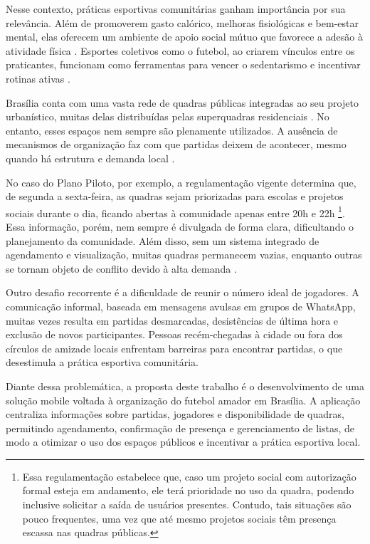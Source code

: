 Nesse contexto, práticas esportivas comunitárias ganham importância por sua relevância. Além de promoverem gasto calórico, melhoras fisiológicas e bem-estar mental, elas oferecem um ambiente de apoio social mútuo que favorece a adesão à atividade física \cite{ministerio2023}. Esportes coletivos como o futebol, ao criarem vínculos entre os praticantes, funcionam como ferramentas para vencer o sedentarismo e incentivar rotinas ativas \cite{ministerio2023,carbinatto2022}.

Brasília conta com uma vasta rede de quadras públicas integradas ao seu projeto urbanístico, muitas delas distribuídas pelas superquadras residenciais \cite{segov2023}. No entanto, esses espaços nem sempre são plenamente utilizados. A ausência de mecanismos de organização faz com que partidas deixem de acontecer, mesmo quando há estrutura e demanda local \cite{ipea2021}.

No caso do Plano Piloto, por exemplo, a regulamentação vigente determina que, de segunda a sexta-feira, as quadras sejam priorizadas para escolas e projetos sociais durante o dia, ficando abertas à comunidade apenas entre 20h e 22h \cite{peixoto2025}\footnote{Essa regulamentação estabelece que, caso um projeto social com autorização formal esteja em andamento, ele terá prioridade no uso da quadra, podendo inclusive solicitar a saída de usuários presentes. Contudo, tais situações são pouco frequentes, uma vez que até mesmo projetos sociais têm presença escassa nas quadras públicas.}. Essa informação, porém, nem sempre é divulgada de forma clara, dificultando o planejamento da comunidade. Além disso, sem um sistema integrado de agendamento e visualização, muitas quadras permanecem vazias, enquanto outras se tornam objeto de conflito devido à alta demanda \cite{agenciabrasilia2025}.

Outro desafio recorrente é a dificuldade de reunir o número ideal de jogadores. A comunicação informal, baseada em mensagens avulsas em grupos de WhatsApp, muitas vezes resulta em partidas desmarcadas, desistências de última hora e exclusão de novos participantes. Pessoas recém-chegadas à cidade ou fora dos círculos de amizade locais enfrentam barreiras para encontrar partidas, o que desestimula a prática esportiva comunitária.

Diante dessa problemática, a proposta deste trabalho é o desenvolvimento de uma solução mobile voltada à organização do futebol amador em Brasília. A aplicação centraliza informações sobre partidas, jogadores e disponibilidade de quadras, permitindo agendamento, confirmação de presença e gerenciamento de listas, de modo a otimizar o uso dos espaços públicos e incentivar a prática esportiva local.

